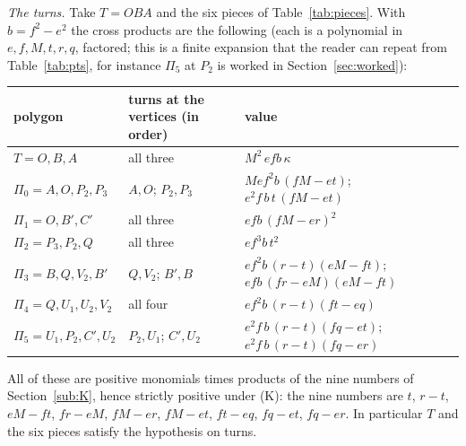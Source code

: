 \documentclass[11pt,reqno]{amsart}
\theoremstyle{plain}
\theoremstyle{definition}
\begin{document}
\emph{The turns.} Take $T=OBA$ and the six pieces of Table~\ref{tab:pieces}. With $b=f^2-e^2$ the cross products are the following (each is a polynomial in $e,f,M,t,r,q$, factored; this is a finite expansion that the reader can repeat from Table~\ref{tab:pts}, for instance $\Pi_5$ at $P_2$ is worked in Section~\ref{sec:worked}):
\begin{center}\small
\begin{tabular}{@{}llp{6.3cm}@{}}
\toprule
polygon & turns at the vertices (in order) & value\\
\midrule
$T=O,B,A$ & all three & $M^2\,efb\,\kappa$\\
$\Pi_0=A,O,P_2,P_3$ & $A,O$; $P_2,P_3$ & $Mef^2b\,(fM-et)$; $e^2f\,b\,t\,(fM-et)$\\
$\Pi_1=O,B',C'$ & all three & $efb\,(fM-er)^2$\\
$\Pi_2=P_3,P_2,Q$ & all three & $ef^3b\,t^2$\\
$\Pi_3=B,Q,V_2,B'$ & $Q,V_2$; $B',B$ & $ef^2b\,(r-t)(eM-ft)$; $efb\,(fr-eM)(eM-ft)$\\
$\Pi_4=Q,U_1,U_2,V_2$ & all four & $ef^2b\,(r-t)(ft-eq)$\\
$\Pi_5=U_1,P_2,C',U_2$ & $P_2,U_1$; $C',U_2$ & $e^2f\,b\,(r-t)(fq-et)$; $e^2f\,b\,(r-t)(fq-er)$\\
\bottomrule
\end{tabular}
\end{center}
All of these are positive monomials times products of the nine numbers of Section~\ref{sub:K}, hence strictly positive under (K): the nine numbers are $t$, $r-t$, $eM-ft$, $fr-eM$, $fM-er$, $fM-et$, $ft-eq$, $fq-et$, $fq-er$. In particular $T$ and the six pieces satisfy the hypothesis on turns.
\end{document}
